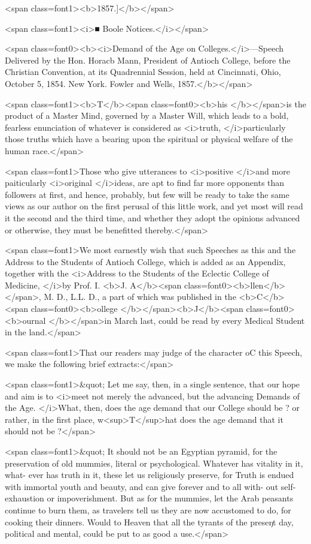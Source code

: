 <span class=font1><b>1857.]</b></span>

<span class=font1><i>■ Boole Notices.</i></span>

<span class=font0><b><i>Demand of the Age on Colleges.</i>---Speech Delivered by the Hon. Horacb Mann, President of
Antioch College, before the Christian Convention, at its Quadrennial Session, held at
Cincinnati, Ohio, October 5, 1854.   New York.   Fowler and Wells, 1857.</b></span>

<span class=font1><b>T</b><span class=font0><b>his </b></span>is the product of a Master Mind, governed by a Master Will,
which leads to a bold, fearless enunciation of whatever is considered as
<i>truth, </i>particularly those truths which have a bearing upon the spiritual
or physical welfare of the human race.</span>

<span class=font1>Those who give utterances to <i>positive </i>and more paiticularly <i>original
</i>ideas, are apt to find far more opponents than followers at first, and
hence, probably, but few will be ready to take the same views as our
author on the first perusal of this little work, and yet most will read it
the second and the third time, and whether they adopt the opinions
advanced or otherwise, they must be benefitted thereby.</span>

<span class=font1>We most earnestly wish that such Speeches as this and the Address
to the Students of Antioch College, which is added as an Appendix,
together with the <i>Address to the Students of the Eclectic College of
Medicine, </i>by Prof. I. <b>J. A</b><span class=font0><b>llen</b></span>, M. D., L.L. D., a part of which was
published in the <b>C</b><span class=font0><b>ollege </b></span><b>J</b><span class=font0><b>ournal </b></span>in March last, could be read by every
Medical Student in the land.</span>

<span class=font1>That our readers may judge of the character oC this Speech, we
make the following brief extracts:</span>

<span class=font1>&quot; Let me say, then, in a single sentence, that our hope and aim is to
<i>meet not merely the advanced, but the advancing Demands of the Age.
</i>What, then, does the age demand that our College should be ? or rather,
in the first place, w<sup>T</sup>hat does the age demand that it should not be ?</span>

<span class=font1>&quot; It should not be an Egyptian pyramid, for the preservation of old
mummies, literal or psychological. Whatever has vitality in it, what-
ever has truth in it, these let us religiously preserve, for Truth is endued
with immortal youth and beauty, and can give forever and to all with-
out self-exhaustion or impoverishment. But as for the mummies, let
the Arab peasants continue to burn them, as travelers tell us they are
now accustomed to do, for cooking their dinners. Would to Heaven
that all the tyrants of the preseŋt day, political and mental, could be
put to as good a use.</span>

